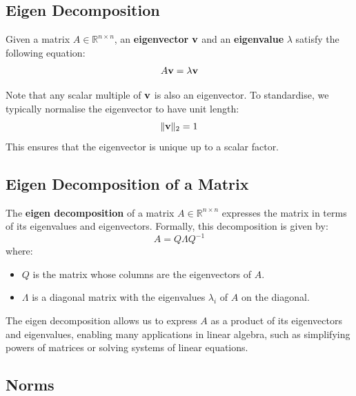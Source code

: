 \subsection{Eigen Decomposition}

Given a matrix \( A \in \mathbb{R}^{n \times n} \), an \textbf{eigenvector} \( \mathbf{v} \) and an \textbf{eigenvalue} \( \lambda \) satisfy the following equation:
\begin{equation}
    A \mathbf{v} = \lambda \mathbf{v}
\end{equation}

Note that any scalar multiple of \( \mathbf{v} \) is also an eigenvector. To standardise, we typically normalise the eigenvector to have unit length:
\begin{equation}
    \| \mathbf{v} \|_2 = 1
\end{equation}
This ensures that the eigenvector is unique up to a scalar factor.

\subsection{Eigen Decomposition of a Matrix}

The \textbf{eigen decomposition} of a matrix \( A \in \mathbb{R}^{n \times n} \) expresses the matrix in terms of its eigenvalues and eigenvectors. Formally, this decomposition is given by:
\begin{equation}
    A = Q \Lambda Q^{-1}
\end{equation}
where:
\begin{itemize}
    \item \( Q \) is the matrix whose columns are the eigenvectors of \( A \).
    \item \( \Lambda \) is a diagonal matrix with the eigenvalues \( \lambda_i \) of \( A \) on the diagonal.
\end{itemize}
The eigen decomposition allows us to express \( A \) as a product of its eigenvectors and eigenvalues, enabling many applications in linear algebra, such as simplifying powers of matrices or solving systems of linear equations.

\subsection{Norms}

